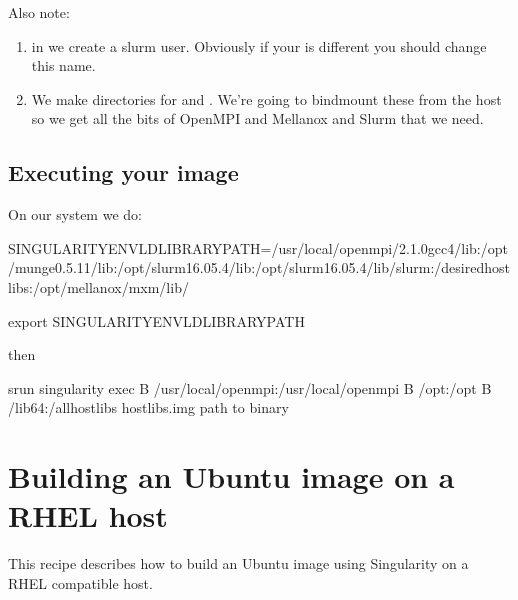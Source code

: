 \documentclass[letterpaper,10pt,english]{sphinxmanual}
\begin{document}
Also note:
\begin{enumerate}
\item {} 
in  we create a slurm user. Obviously if your  is different you should change this name.

\item {} 
We make directories for  and . We’re going to bindmount these from the host so we get
all the bits of OpenMPI and Mellanox and Slurm that we need.

\end{enumerate}


\subsection{Executing your image}
\label{\detokenize{appendix:executing-your-image}}
On our system we do:

%
\begin{sphinxVerbatim}[commandchars=\\\{\}]
SINGULARITYENV\PYGZus{}LD\PYGZus{}LIBRARY\PYGZus{}PATH=/usr/local/openmpi/2.1.0\PYGZhy{}gcc4/lib:/opt/munge\PYGZhy{}0.5.11/lib:/opt/slurm\PYGZhy{}16.05.4/lib:/opt/slurm\PYGZhy{}16.05.4/lib/slurm:/desired\PYGZus{}hostlibs:/opt/mellanox/mxm/lib/

export SINGULARITYENV\PYGZus{}LD\PYGZus{}LIBRARY\PYGZus{}PATH
\end{sphinxVerbatim}

then

%
\begin{sphinxVerbatim}[commandchars=\\\{\}]
srun  singularity exec \PYGZhy{}B /usr/local/openmpi:/usr/local/openmpi \PYGZhy{}B /opt:/opt \PYGZhy{}B /lib64:/all\PYGZus{}hostlibs hostlibs.img \PYGZlt{}path to binary\PYGZgt{}
\end{sphinxVerbatim}


\section{Building an Ubuntu image on a RHEL host}
\label{\detokenize{appendix:building-an-ubuntu-image-on-a-rhel-host}}\label{\detokenize{appendix:sec-building-ubuntu-rhel-host}}
This recipe describes how to build an Ubuntu image using Singularity on a RHEL compatible host.
\end{document}
